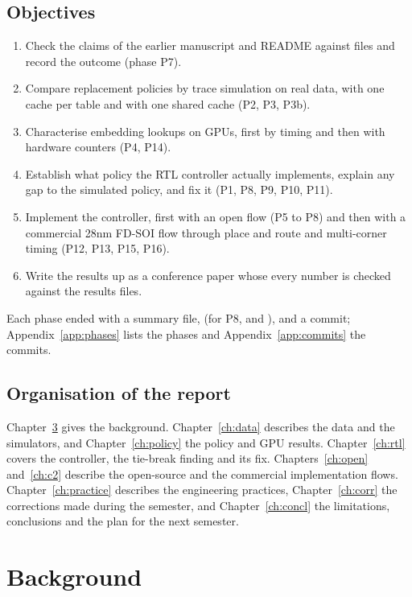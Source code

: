 \documentclass[11pt,a4paper]{report}
\begin{document}
\section{Objectives}
\begin{enumerate}[label=O\arabic*.]
\item Check the claims of the earlier manuscript and README against files and record the outcome (phase P7).
\item Compare replacement policies by trace simulation on real data, with one cache per table and with one shared
cache (P2, P3, P3b).
\item Characterise embedding lookups on GPUs, first by timing and then with hardware counters (P4, P14).
\item Establish what policy the RTL controller actually implements, explain any gap to the simulated policy, and fix
it (P1, P8, P9, P10, P11).
\item Implement the controller, first with an open flow (P5 to P8) and then with a commercial 28nm FD-SOI flow through
place and route and multi-corner timing (P12, P13, P15, P16).
\item Write the results up as a conference paper whose every number is checked against the results files.
\end{enumerate}
Each phase ended with a summary file,  (for P8,  and ), and a commit; Appendix~\ref{app:phases}
lists the phases and Appendix~\ref{app:commits} the commits.

\section{Organisation of the report}
Chapter~\ref{ch:bg} gives the background. Chapter~\ref{ch:data} describes the data and the simulators, and
Chapter~\ref{ch:policy} the policy and GPU results. Chapter~\ref{ch:rtl} covers the controller, the tie-break finding
and its fix. Chapters~\ref{ch:open} and~\ref{ch:c2} describe the open-source and the commercial implementation
flows. Chapter~\ref{ch:practice} describes the engineering practices, Chapter~\ref{ch:corr} the corrections made
during the semester, and Chapter~\ref{ch:concl} the limitations, conclusions and the plan for the next semester.

\chapter{Background}\label{ch:bg}
\end{document}
